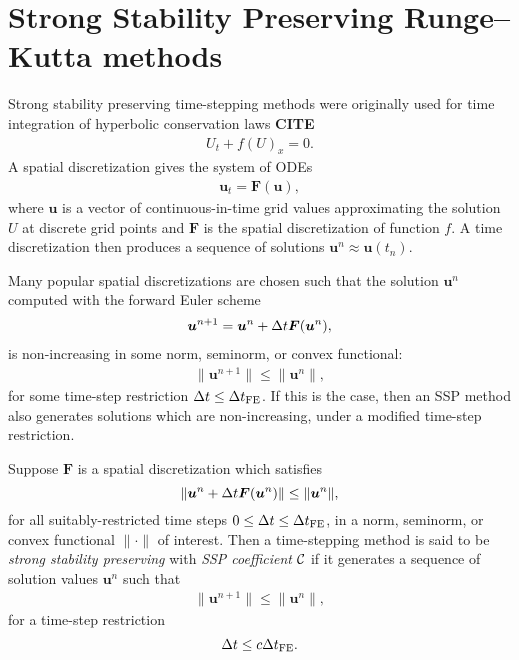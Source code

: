 \section{Strong Stability Preserving Runge--Kutta methods}
\label{sec:SSP}


Strong stability preserving time-stepping methods were originally used for time integration of hyperbolic conservation laws \textbf{CITE}
\begin{align*}
    U_t + f(U)_x = 0.   %
\end{align*}
A spatial discretization gives the system of ODEs
\begin{align*}
    \bm{u}_{t} = \bm{F}(\bm{u}),
\end{align*}
where $\bm{u}$ is a vector of continuous-in-time grid values approximating the solution $U$ at discrete grid points and $\bm{F}$ is the spatial discretization of function $f$.
A time discretization then produces a sequence of solutions $\bm{u}^{n} \approx \bm{u}(t_n)$.

Many popular spatial discretizations are chosen such that the solution $\bm{u}^{n}$ computed with the forward Euler scheme
\begin{align}\label{eq:forwardEuler}
    \bm{u}^{n+1} = \bm{u}^{n} + \Delta t\bm{F}(\bm{u}^{n}),
\end{align}
is non-increasing in some norm, seminorm, or convex functional:
\begin{align*}
    \|\bm{u}^{n+1}\| \le \|\bm{u}^n\|,
\end{align*}
for some time-step restriction $\Delta t \leq \Delta t_{\text{FE}}$.
If this is the case, then an SSP method also generates solutions which are non-increasing, under a modified time-step restriction.
\begin{definition}
Suppose $\bm{F}$ is a spatial discretization which satisfies
$$\|\bm{u}^{n} + \Delta t\bm{F}(\bm{u}^{n})\| \le \|\bm{u}^n\|,$$
for all suitably-restricted time steps
$0 \le \Delta t \le \Delta t_{\text{FE}}$,
in a norm, seminorm, or convex functional $\|\cdot\|$ of interest.
Then a time-stepping method is said to be \emph{strong stability preserving} with \emph{SSP coefficient} $\mathcal{C}$ if it generates a sequence of solution values $\bm{u}^n$ 
such that
\begin{align*}
  \|\bm{u}^{n+1}\| \le \|\bm{u}^n\|,
\end{align*}
for a time-step restriction
$$\Delta t \leq c \Delta t_{\text{FE}}.$$
\end{definition}


